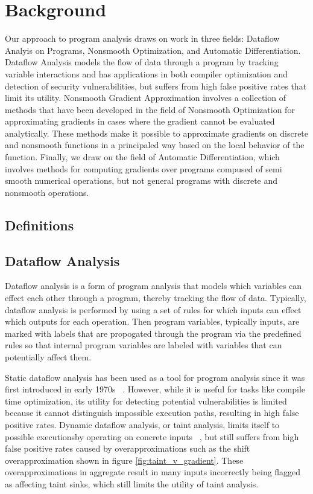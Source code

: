 
\section{Background}

Our approach to program analysis draws on work in three fields: Dataflow Analyis on Programs, Nonsmooth Optimization, and Automatic Differentiation. Dataflow Analysis models the flow of data through a program by tracking variable interactions and has applications in both compiler optimization and detection of security vulnerabilities, but suffers from high false positive rates that limit its utility. Nonsmooth Gradient Approximation involves a collection of methods that have been developed in the field of Nonsmooth Optimization for approximating gradients in cases where the gradient cannot be evaluated analytically. These methods make it possible to approximate gradients on discrete and nonsmooth functions in a principaled way based on the local behavior of the function. Finally, we draw on the field of Automatic Differentiation, which involves methods for computing gradients over programs compused of semi smooth numerical operations, but not general programs with discrete and nonsmooth operations.


\subsection{Definitions}


\subsection{Dataflow Analysis}

Dataflow analysis is a form of program analysis that models which variables can effect each other through a program, thereby tracking the flow of data. Typically, dataflow analysis is performed by using a set of rules for which inputs can effect which outputs for each operation. Then program variables, typically inputs, are marked with labels that are propogated through the program via the predefined rules so that internal program variables are labeled with variables that can potentially affect them. 

Static dataflow analysis has been used as a tool for program analysis since it was first introduced in early 1970s ~\cite{kildall1973unified}. However, while it is useful for tasks like compile time optimization, its utility for detecting potential vulnerabilities is limited because it cannot distinguish impossible execution paths, resulting in high false positive rates. Dynamic dataflow analysis, or taint analysis, limits itself to possible executionsby operating on concrete inputs ~\cite{newsome2005dynamic}, but still suffers from high false positive rates caused by overapproximations such as the shift overapproximation shown in figure \ref{fig:taint_v_gradient}. These overapproximations in aggregate result in many inputs incorrectly being flagged as affecting taint sinks, which still limits the utility of taint analysis.

